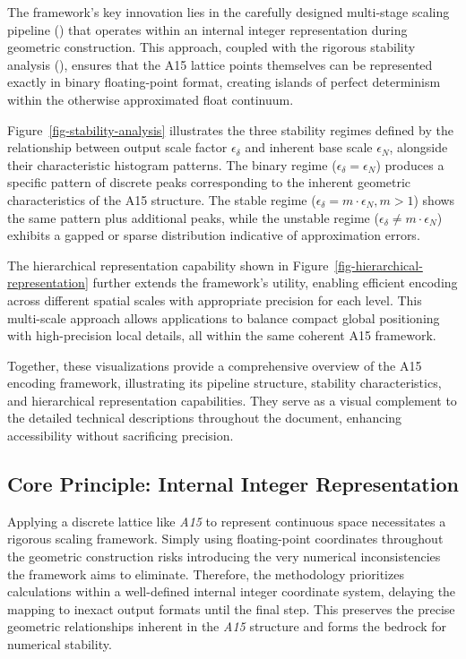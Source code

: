 \documentclass[10pt]{article}
\def\AAAB{\textit{A15}}
\begin{document}
The framework's key innovation lies in the carefully designed multi-stage scaling pipeline () that operates within an internal integer representation during geometric construction. This approach, coupled with the rigorous stability analysis (), ensures that the A15 lattice points themselves can be represented exactly in binary floating-point format, creating islands of perfect determinism within the otherwise approximated float continuum.

Figure~\ref{fig-stability-analysis} illustrates the three stability regimes defined by the relationship between output scale factor $\epsilon_\delta$ and inherent base scale $\epsilon_N$, alongside their characteristic histogram patterns. The binary regime ($\epsilon_\delta = \epsilon_N$) produces a specific pattern of discrete peaks corresponding to the inherent geometric characteristics of the A15 structure. The stable regime ($\epsilon_\delta = m \cdot \epsilon_N, m > 1$) shows the same pattern plus additional peaks, while the unstable regime ($\epsilon_\delta \neq m \cdot \epsilon_N$) exhibits a gapped or sparse distribution indicative of approximation errors.

The hierarchical representation capability shown in Figure~\ref{fig-hierarchical-representation} further extends the framework's utility, enabling efficient encoding across different spatial scales with appropriate precision for each level. This multi-scale approach allows applications to balance compact global positioning with high-precision local details, all within the same coherent A15 framework.

Together, these visualizations provide a comprehensive overview of the A15 encoding framework, illustrating its pipeline structure, stability characteristics, and hierarchical representation capabilities. They serve as a visual complement to the detailed technical descriptions throughout the document, enhancing accessibility without sacrificing precision.

\subsection{Core Principle: Internal Integer Representation}\label{subsec-scaling-framework}

Applying a discrete lattice like \AAAB{} to represent continuous space necessitates a rigorous scaling framework. Simply using floating-point coordinates throughout the geometric construction risks introducing the very numerical inconsistencies the framework aims to eliminate. Therefore, the methodology prioritizes calculations within a well-defined internal integer coordinate system, delaying the mapping to inexact output formats until the final step. This preserves the precise geometric relationships inherent in the \AAAB{} structure and forms the bedrock for numerical stability.
\end{document}

